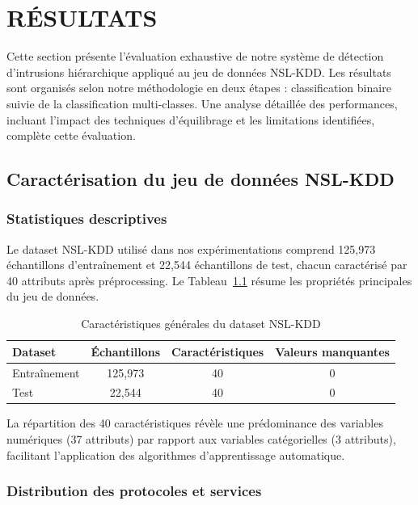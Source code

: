 \newpage
\chapter{RÉSULTATS}

Cette section présente l'évaluation exhaustive de notre système de détection d'intrusions hiérarchique appliqué au jeu de données NSL-KDD. Les résultats sont organisés selon notre méthodologie en deux étapes : classification binaire suivie de la classification multi-classes. Une analyse détaillée des performances, incluant l'impact des techniques d'équilibrage et les limitations identifiées, complète cette évaluation.

\section{Caractérisation du jeu de données NSL-KDD}

\subsection{Statistiques descriptives}

Le dataset NSL-KDD utilisé dans nos expérimentations comprend 125,973 échantillons d'entraînement et 22,544 échantillons de test, chacun caractérisé par 40 attributs apr\`{e}s préprocessing. Le Tableau~\ref{tab:dataset_summary} résume les propriétés principales du jeu de données.

\begin{table}[H]
    \centering
    \caption{Caractéristiques générales du dataset NSL-KDD}
    \begin{tabular}{|l|c|c|c|}
        \hline
        \textbf{Dataset} & \textbf{Échantillons} & \textbf{Caractéristiques} & \textbf{Valeurs manquantes} \\
        \hline
        Entraînement & 125,973 & 40 & 0 \\
        Test & 22,544 & 40 & 0 \\
        \hline
    \end{tabular}
    \label{tab:dataset_summary}
\end{table}

La répartition des 40 caractéristiques révèle une prédominance des variables numériques (37 attributs) par rapport aux variables catégorielles (3 attributs), facilitant l'application des algorithmes d'apprentissage automatique.

\subsection{Distribution des protocoles et services}

